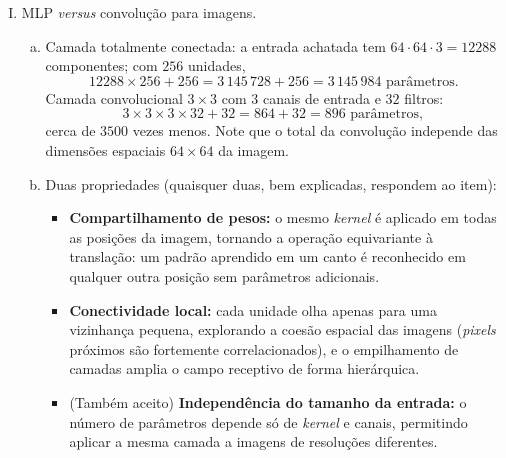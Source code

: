 \documentclass{dlproblemset}
\begin{document}
\begin{enumerate}[I)]
\item MLP \textit{versus} convolução para imagens. %
\begin{enumerate}[a.]
    \item Camada totalmente conectada: a entrada achatada tem $64 \cdot 64 \cdot 3 = 12288$ componentes; com $256$ unidades,
    \[
    12288 \times 256 + 256 = 3\,145\,728 + 256 = 3\,145\,984 \text{ parâmetros}.
    \]
    Camada convolucional $3 \times 3$ com $3$ canais de entrada e $32$ filtros:
    \[
    3 \times 3 \times 3 \times 32 + 32 = 864 + 32 = 896 \text{ parâmetros},
    \]
    cerca de $3500$ vezes menos. Note que o total da convolução independe das dimensões espaciais $64 \times 64$ da imagem.

    \item Duas propriedades (quaisquer duas, bem explicadas, respondem ao item):
    \begin{itemize}
        \item \textbf{Compartilhamento de pesos:} o mesmo \textit{kernel} é aplicado em todas as posições da imagem, tornando a operação equivariante à translação: um padrão aprendido em um canto é reconhecido em qualquer outra posição sem parâmetros adicionais.
        \item \textbf{Conectividade local:} cada unidade olha apenas para uma vizinhança pequena, explorando a coesão espacial das imagens (\textit{pixels} próximos são fortemente correlacionados), e o empilhamento de camadas amplia o campo receptivo de forma hierárquica.
        \item (Também aceito) \textbf{Independência do tamanho da entrada:} o número de parâmetros depende só de \textit{kernel} e canais, permitindo aplicar a mesma camada a imagens de resoluções diferentes.
    \end{itemize}
\end{enumerate}

\end{enumerate}
\end{document}
